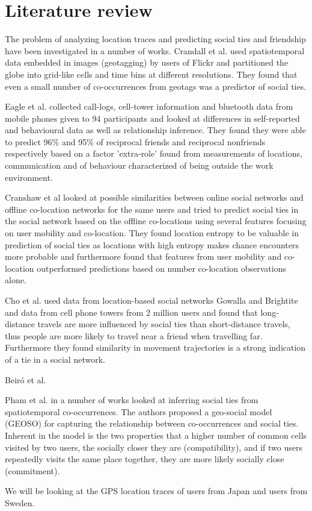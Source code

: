 \section{Literature review}
The problem of analyzing location traces and predicting social ties and friendship have been investigated in a number of works. Crandall et al.\cite{ISTfGC} used spatiotemporal data embedded in images (geotagging) by users of Flickr and partitioned the globe into grid-like cells and time bins at different resolutions. They found that even a small number of co-occurrences from geotags was a predictor of social ties.

Eagle et al.\cite{eagle} collected call-logs, cell-tower information and bluetooth data from mobile phones given to 94 participants and looked at differences in self-reported and behavioural data as well as relationship inference. They found they were able to predict 96\% and 95\% of reciprocal friends and reciprocal nonfriends respectively based on a factor 'extra-role' found from measurements of locations, communication and of behaviour characterized of being outside the work environment.

Cranshaw et al\cite{cranshaw2010bridging} looked at possible similarities between online social networks and offline co-location networks for the same users and tried to predict social ties in the social network based on the offline co-locations using several features focusing on user mobility and co-location. They found location entropy to be valuable in prediction of social ties as locations with high entropy makes chance encounters more probable and furthermore found that features from user mobility and co-location outperformed predictions based on number co-location observations alone.

Cho et al.\cite{FaMUMiLBSN} used data from location-based social networks Gowalla and Brightite and data from cell phone towers from 2 million users and found that long-distance travels are more influenced by social ties than short-distance travels, thus people are more likely to travel near a friend when travelling far. Furthermore they found similarity in movement trajectories is a strong indication of a tie in a social network.

Beiró et al. \cite{human_mob_through_assi}

Pham et al. in a number of works looked at inferring social ties from spatiotemporal co-occurrences\cite{pham2011towards}\cite{iRWRfSD}. The authors proposed a geo-social model (GEOSO) for capturing the relationship between co-occurrences and social ties. Inherent in the model is the two properties that a higher number of common cells visited by two users, the socially closer they are (compatibility), and if two users repeatedly visits the same place together, they are more likely socially close (commitment).

We will be looking at the GPS location traces of \numberUsersJapan{} users from Japan and \numberUsersSweden{} users from Sweden.